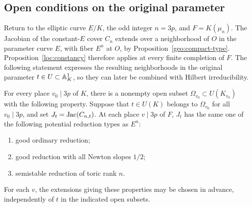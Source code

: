 \subsection{Open conditions on the original parameter}

Return to the elliptic curve $E/K$, the odd integer $n=3p$, and
$F=K(\mu_n)$.  The Jacobian of the constant-$E$ cover $C_n$ extends over
a neighborhood of $O$ in the parameter curve $E$, with fiber $E^n$ at
$O$, by Proposition~\ref{geo:compact-type}.  Proposition~\ref{loc:constancy}
therefore applies at every finite completion of $F$.  The following statement
expresses the resulting neighborhoods in the original parameter
$t\in U\subset\mathbb A^1_K$, so they can later be combined with Hilbert
irreducibility.

\begin{proposition}\label{loc:opens}
For every place $v_0\mid 3p$ of $K$, there is a nonempty open subset
$\Omega_{v_0}\subset U(K_{v_0})$ with the following property.
Suppose that $t\in U(K)$ belongs to $\Omega_{v_0}$ for all $v_0\mid3p$,
and set $J_t=\operatorname{Jac}(C_{n,t})$.  At each place $v\mid3p$ of $F$,
$J_t$ has the same one of the following potential reduction types
as $E^n$:
\begin{enumerate}
\item good ordinary reduction;
\item good reduction with all Newton slopes $1/2$;
\item semistable reduction of toric rank $n$.
\end{enumerate}
For each $v$, the extensions giving these properties may be chosen
in advance, independently of $t$ in the indicated open subsets.
\end{proposition}

